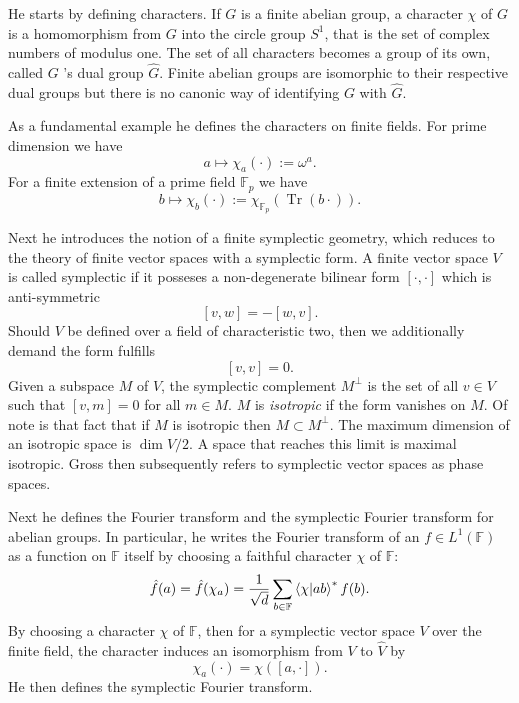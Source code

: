 \documentclass[a4paper]{article}
\DeclareMathOperator{\Tr}{Tr}
\begin{document}
  He starts by defining characters. If $G$ is a finite
  abelian group, a character $\chi$ of $G$ is a homomorphism
  from $G$ into the circle group $S^{1}$, that is the set of
  complex numbers of modulus one. The set of all characters
  becomes a group of its own, called $G$ 's dual group $\hat
  G$. Finite abelian groups are isomorphic to their
  respective dual groups but there is no canonic way of
  identifying  $G$ with $\hat G$.

  As a fundamental example he defines the characters on
  finite fields. For prime dimension we have
  \[
    a \mapsto \chi_a(\cdot) := \omega^{a}.
  \] 
  For a finite extension of a prime field $\mathbb F_p$ we
  have
  \[
    b \mapsto \chi_b(\cdot) := \chi_{\mathbb F_p}(\Tr(b
    \cdot)).
  \] 

  Next he introduces the notion of a finite symplectic
  geometry, which reduces to the theory of finite vector
  spaces with a symplectic form. A finite vector space $V$ 
  is called symplectic if it posseses a non-degenerate
  bilinear form $[\cdot,\cdot]$ which is anti-symmetric
  \[
    [v,w] = -[w,v].
  \] 
  Should $V$ be defined over a field of characteristic two,
  then we additionally demand the form fulfills
  \[
    [v,v] = 0.
  \] 
  Given a subspace $M$ of $V$, the symplectic complement
  $M^{\perp}$ is the set of all $v \in V$ such that $[v,m] =
  0$ for all $m \in M$. $M$ is \textit{isotropic} if the
  form vanishes on $M$. Of note is that fact that if $M$ is
  isotropic then $M \subset M^{\perp}$. The maximum
  dimension of an isotropic space is $\dim V / 2$. A space
  that reaches this limit is maximal isotropic. Gross then
  subsequently refers to symplectic vector spaces as phase
  spaces.

  Next he defines the Fourier transform and the symplectic
  Fourier transform for abelian groups. In particular, he
  writes the Fourier transform of an $f \in L^{1}(\mathbb
  F)$ as a function on $\mathbb F$ itself by choosing a
  faithful character $\chi$ of $\mathbb F$:
  \[
    \hat f(a)
    = \hat f(\chi_a)
    = \frac{1}{\sqrt{d}} \sum_{b \in \mathbb F}^{}
    \braket{\chi|ab}^{*}f(b).
  \] 
  By choosing a character $\chi$ of $\mathbb F$, then for a
  symplectic vector space $V$ over the finite field, the
  character induces an isomorphism from $V$ to $\hat V$ by
  \[
    \chi_a(\cdot) = \chi([a,\cdot]).
  \] 
  He then defines the symplectic Fourier transform. 
\end{document}
